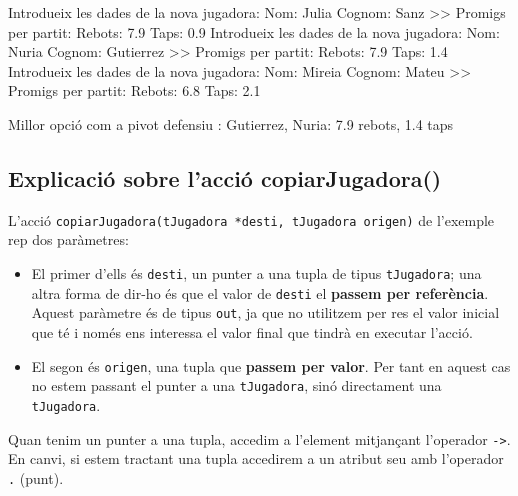 \documentclass[]{book}
\newenvironment{Shaded}{\begin{snugshade}}{\end{snugshade}}
\newcommand{\FloatTok}[1]{\textcolor[rgb]{0.00,0.00,0.81}{#1}}
\newcommand{\NormalTok}[1]{#1}
\providecommand{\tightlist}{%
  \setlength{\itemsep}{0pt}\setlength{\parskip}{0pt}}
\begin{document}
\begin{Shaded}
\begin{Highlighting}[]
\NormalTok{Introdueix les dades de la nova jugadora: }
\NormalTok{    Nom: Julia}
\NormalTok{    Cognom: Sanz}
\NormalTok{    \textgreater{}\textgreater{} Promigs per partit:}
\NormalTok{    Rebots: }\FloatTok{7.9}
\NormalTok{    Taps: }\FloatTok{0.9}
\NormalTok{Introdueix les dades de la nova jugadora: }
\NormalTok{    Nom: Nuria}
\NormalTok{    Cognom: Gutierrez}
\NormalTok{    \textgreater{}\textgreater{} Promigs per partit:}
\NormalTok{    Rebots: }\FloatTok{7.9}
\NormalTok{    Taps: }\FloatTok{1.4}
\NormalTok{Introdueix les dades de la nova jugadora: }
\NormalTok{    Nom: Mireia}
\NormalTok{    Cognom: Mateu}
\NormalTok{    \textgreater{}\textgreater{} Promigs per partit:}
\NormalTok{    Rebots: }\FloatTok{6.8}
\NormalTok{    Taps: }\FloatTok{2.1}

\NormalTok{Millor opció com a pivot defensiu : }
\NormalTok{Gutierrez, Nuria: }\FloatTok{7.9}\NormalTok{ rebots, }\FloatTok{1.4}\NormalTok{ taps }
\end{Highlighting}
\end{Shaded}

\hypertarget{explicacio-sobre-laccio-copiarjugadora}{%
\subsection{Explicació sobre l'acció copiarJugadora()}\label{explicacio-sobre-laccio-copiarjugadora}}

L'acció \texttt{copiarJugadora(tJugadora\ *desti,\ tJugadora\ origen)} de l'exemple rep dos paràmetres:

\begin{itemize}
\tightlist
\item
  El primer d'ells és \texttt{desti}, un punter a una tupla de tipus \texttt{tJugadora}; una altra forma de dir-ho és que el valor de \texttt{desti} el \textbf{passem per referència}. Aquest paràmetre és de tipus \texttt{out}, ja que no utilitzem per res el valor inicial que té i només ens interessa el valor final que tindrà en executar l'acció.
\item
  El segon és \texttt{origen}, una tupla que \textbf{passem per valor}. Per tant en aquest cas no estem passant el punter a una \texttt{tJugadora}, sinó directament una \texttt{tJugadora}.
\end{itemize}

Quan tenim un punter a una tupla, accedim a l'element mitjançant l'operador \texttt{-\textgreater{}}. En canvi, si estem tractant una tupla accedirem a un atribut seu amb l'operador \texttt{.} (punt).
\end{document}
